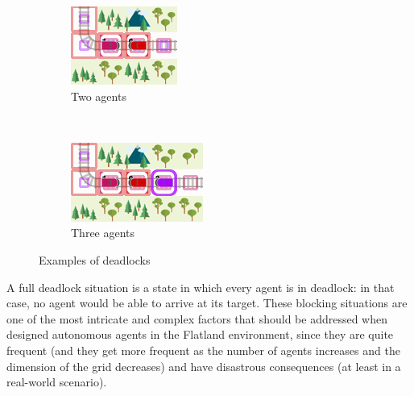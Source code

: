\documentclass[a4paper,10pt]{report}
\begin{document}
\begin{figure}[h]
	\centering
	\captionsetup[subfigure]{justification=centering}
	\begin{subfigure}[t]{.4\linewidth}
		\includegraphics[width=\textwidth]{two-deadlock.png}
		\caption{Two agents}
		\label{fig:two-deadlock}
	\end{subfigure}%
	~
	\begin{subfigure}[t]{.4\linewidth}
		\includegraphics[width=\textwidth]{three-deadlock.png}
		\caption{Three agents}
		\label{fig:three-deadlock}
	\end{subfigure}%

	\caption{Examples of deadlocks}
	\label{fig:deadlocks}
\end{figure}

A full deadlock situation is a state in which every agent is in deadlock: in that case, no agent would be able to arrive at its target. These blocking situations are one of the most intricate and complex factors that should be addressed when designed autonomous agents in the Flatland environment, since they are quite frequent (and they get more frequent as the number of agents increases and the dimension of the grid decreases) and have disastrous consequences (at least in a real-world scenario).
\end{document}
